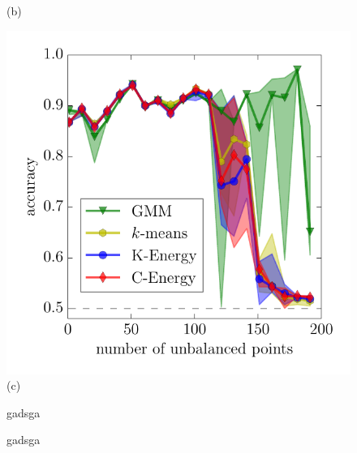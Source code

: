 \documentclass{article}
\begin{document}
\begin{figure}
\begin{minipage}{0.33\textwidth}
(b)
\end{minipage}
\begin{minipage}{0.33\textwidth}
\centering
\includegraphics[width=\textwidth]{gauss_pis.pdf}\\[-.8em]
(c)
\end{minipage}
\caption{
\label{fig:dimension}
gadsga
}
\end{figure}

\begin{figure}
\centering
\caption{
\label{fig:unbalanced}
gadsga
}
\end{figure}
\end{document}
